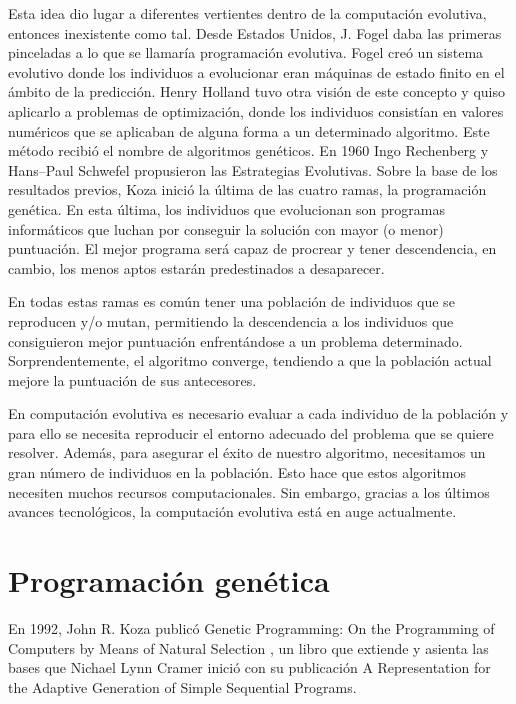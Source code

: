 Esta idea dio lugar a diferentes vertientes dentro de la computación evolutiva,
entonces inexistente como tal. Desde Estados Unidos, J. Fogel  \cite{Fogel:1966}
daba las primeras pinceladas a lo que se llamaría programación evolutiva. Fogel
creó un sistema evolutivo donde los individuos a evolucionar eran máquinas de
estado finito en el ámbito de la predicción. Henry Holland  \cite{Holland:1975}
tuvo otra visión de este concepto y quiso aplicarlo a problemas de optimización,
donde los individuos consistían en valores numéricos que se aplicaban de alguna
forma a un determinado algoritmo. Este método recibió el nombre de algoritmos
genéticos. En 1960 Ingo Rechenberg y Hans--Paul Schwefel  \cite{Rechenberg:1971}
propusieron las Estrategias Evolutivas. Sobre la base de los resultados previos,
Koza  \cite{Koza:1992} inició la última de las cuatro ramas, la programación
genética. En esta última, los individuos que evolucionan son programas informáticos que luchan por
conseguir la solución con mayor (o menor) puntuación.  El mejor programa será
capaz de procrear y tener descendencia, en cambio, los menos aptos estarán
predestinados a desaparecer.

En todas estas ramas es común tener una población de individuos que se reproducen
y/o mutan, permitiendo la descendencia a los individuos que consiguieron mejor
puntuación enfrentándose a un problema determinado. Sorprendentemente, el
algoritmo converge, tendiendo a que la población actual mejore la puntuación de sus
antecesores.

En computación evolutiva es necesario evaluar a cada individuo de la población y
para ello se necesita reproducir el entorno adecuado del problema que se quiere
resolver. Además, para asegurar el éxito de nuestro algoritmo, necesitamos un
gran número de individuos en la población. Esto hace que estos algoritmos
necesiten muchos recursos computacionales. Sin embargo, gracias a los últimos
avances tecnológicos, la computación evolutiva está en auge actualmente.

\section{Programación genética}

En 1992, John R. Koza publicó Genetic Programming: On the Programming of
Computers by Means of Natural Selection \cite{Koza:1992}, un libro que extiende y
asienta las bases que Nichael Lynn Cramer \cite{Cramer:1985} inició con su
publicación A Representation for the Adaptive Generation of Simple Sequential Programs.


